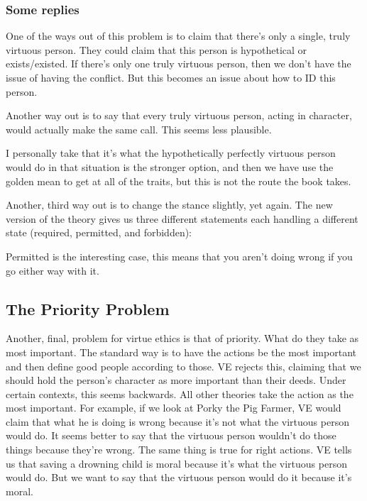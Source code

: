 \subsubsection{Some replies}

One of the ways out of this problem is to claim that there’s only a single, truly virtuous person. They could claim that this person is hypothetical or exists/existed. If there’s only one truly virtuous person, then we don’t have the issue of having the conflict. But this becomes an issue about how to ID this person.

Another way out is to say that every truly virtuous person, acting in character, would actually make the same call. This seems less plausible.

I personally take that it’s what the hypothetically perfectly virtuous person would do in that situation is the stronger option, and then we have use the golden mean to get at all of the traits, but this is not the route the book takes.

Another, third way out is to change the stance slightly, yet again. The new version of the theory gives us three different statements each handling a different state (required, permitted, and forbidden):

Permitted is the interesting case, this means that you aren’t doing wrong if you go either way with it. 
\subsection{The Priority Problem}

Another, final, problem for virtue ethics is that of priority. What do they take as most important. The standard way is to have the actions be the most important and then define good people according to those. VE rejects this, claiming that we should hold the person’s character as more important than their deeds. Under certain contexts, this seems backwards. All other theories take the action as the most important. For example, if we look at Porky the Pig Farmer, VE would claim that what he is doing is wrong because it’s not what the virtuous person would do. It seems better to say that the virtuous person wouldn’t do those things because they’re wrong. The same thing is true for right actions. VE tells us that saving a drowning child is moral because it’s what the virtuous person would do. But we want to say that the virtuous person would do it because it’s moral.
